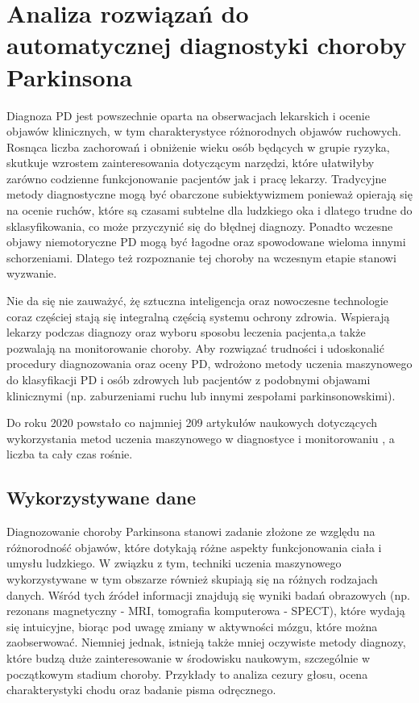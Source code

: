 \chapter{Analiza rozwiązań do automatycznej diagnostyki choroby Parkinsona}\label{ch:analiza-rozwiazan}


Diagnoza PD jest powszechnie oparta na obserwacjach lekarskich i ocenie objawów klinicznych, w tym charakterystyce różnorodnych objawów ruchowych.
Rosnąca liczba zachorowań i obniżenie wieku osób będących w grupie ryzyka, skutkuje wzrostem zainteresowania dotyczącym narzędzi, które ułatwiłyby
zarówno codzienne funkcjonowanie pacjentów jak i pracę lekarzy.
Tradycyjne metody diagnostyczne mogą być obarczone subiektywizmem ponieważ opierają się na ocenie ruchów, które są czasami subtelne dla
ludzkiego oka i dlatego trudne do sklasyfikowania, co może przyczynić się do błędnej diagnozy.
Ponadto wczesne objawy niemotoryczne PD mogą być łagodne oraz spowodowane wieloma innymi schorzeniami.
Dlatego też rozpoznanie tej choroby na wczesnym etapie stanowi wyzwanie.

Nie da się nie zauważyć, żę sztuczna inteligencja oraz nowoczesne technologie coraz częściej stają się integralną częścią systemu ochrony zdrowia.
Wspierają lekarzy podczas diagnozy oraz wyboru sposobu leczenia pacjenta,a także pozwalają na monitorowanie choroby.
Aby rozwiązać trudności i udoskonalić procedury diagnozowania oraz oceny PD, wdrożono metody uczenia maszynowego do klasyfikacji PD i osób zdrowych lub
pacjentów z podobnymi objawami klinicznymi (np. zaburzeniami ruchu lub innymi zespołami parkinsonowskimi).


Do roku 2020 powstało co najmniej 209 artykułów naukowych dotyczących wykorzystania metod uczenia maszynowego w diagnostyce i monitorowaniu \cite{ML_for_PD_review},
a liczba ta cały czas rośnie.


\section{Wykorzystywane dane}\label{sec:dane-przeglad}

Diagnozowanie choroby Parkinsona stanowi zadanie złożone ze względu na różnorodność objawów, które dotykają różne aspekty
funkcjonowania ciała i umysłu ludzkiego.
W związku z tym, techniki uczenia maszynowego wykorzystywane w tym obszarze również skupiają się na różnych rodzajach danych.
Wśród tych źródeł informacji znajdują się wyniki badań obrazowych (np. rezonans magnetyczny - MRI, tomografia komputerowa - SPECT),
które wydają się intuicyjne, biorąc pod uwagę zmiany w aktywności mózgu, które można zaobserwować.
Niemniej jednak, istnieją także mniej oczywiste metody diagnozy, które budzą duże zainteresowanie w środowisku naukowym, szczególnie w początkowym stadium choroby.
Przykłady to analiza cezury głosu, ocena charakterystyki chodu oraz badanie pisma odręcznego.


